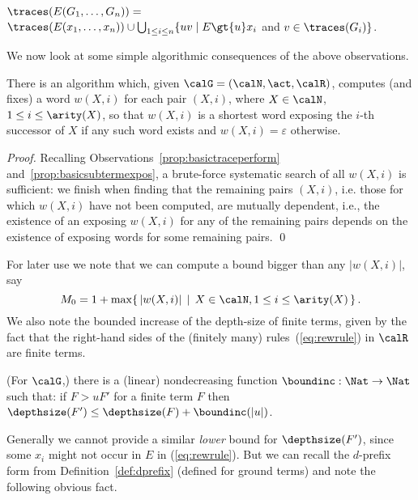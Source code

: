 \documentclass[12pt]{article}
\begin{document}
\begin{observ}\label{prop:segmenttraces}
$\traces(E(G_1,\dots, G_n))=$
\\
$\traces(E(x_1,\dots, x_n))\cup
\bigcup_{1\leq i\leq n}\{uv\mid E\gt{u}x_i$
 and $v\in\traces(G_i)\}$.
\end{observ}
We now look at some simple algorithmic consequences 
of the above observations.

\begin{prop}\label{prop:computwXi}
There is an algorithm which, given 
$\calG=(\calN,\act,\calR)$, computes (and fixes) a word $w(X,i)$
for each pair $(X,i)$, where
 $X\in\calN$, $1\leq i\leq\arity(X)$, so that 
$w(X,i)$ is a shortest word exposing the $i$-th
successor of $X$ if any such word exists and
$w(X,i)=\varepsilon$ otherwise.
\end{prop}

\begin{proof}
Recalling Observations~\ref{prop:basictraceperform}
and~\ref{prop:basicsubtermexpos},
a brute-force systematic search of all $w(X,i)$ is
sufficient:
we finish when
finding that the remaining pairs $(X,i)$, i.e. those
for which $w(X,i)$ have not been
computed, are mutually dependent, i.e., the existence of an exposing 
 $w(X,i)$ for any of the 
 remaining pairs depends on the existence of exposing
 words for some remaining pairs. 
\qed
\end{proof}

\noindent
For later use we note that we can compute a bound bigger than any
$|w(X,i)|$, say
\begin{equation}\label{eq:Mzero}
M_0=1+\max\{\,|w(X,i)| \,\mid\,  X\in\calN, 1\leq i\leq
\arity(X)\,\}\,.
\end{equation}
We also note the bounded increase of the depth-size of finite terms, 
given by the fact that the right-hand sides of 
the (finitely many) rules~(\ref{eq:rewrule}) in $\calR$ are finite terms.


\begin{observ}\label{prop:binc}
(For $\calG$,) there is a (linear) nondecreasing function
 $\boundinc:\Nat\rightarrow\Nat$ such that:
if \mbox{$F\gt{u}F'$} for a finite term $F$ 
then $\depthsize(F')\leq
\depthsize(F)+\boundinc(|u|)$.
\end{observ}
Generally we cannot provide a similar \emph{lower} 
bound for $\depthsize(F')$, 
since some $x_i$ might not occur in $E$ in (\ref{eq:rewrule}).
But we can 
recall the $d$-prefix form from Definition~\ref{def:dprefix}
(defined for ground terms) and note the following obvious fact.
\end{document}
